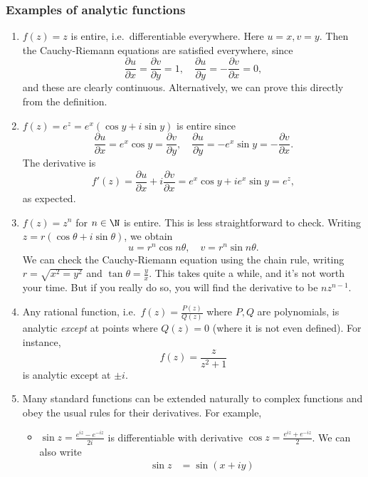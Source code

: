 \documentclass[a4paper]{article}
\begin{document}
\subsubsection*{Examples of analytic functions}
\begin{eg}\leavevmode
  \begin{enumerate}
    \item $f(z) = z$ is entire, i.e.\ differentiable everywhere. Here $u = x, v = y$. Then the Cauchy-Riemann equations are satisfied everywhere, since
      \[
        \frac{\partial u}{\partial x} = \frac{\partial v}{\partial y} = 1,\quad \frac{\partial u}{\partial y} = -\frac{\partial v}{\partial x} = 0,
      \]
      and these are clearly continuous. Alternatively, we can prove this directly from the definition.
    \item $f(z) = e^z = e^x (\cos y + i \sin y)$ is entire since
      \[
        \frac{\partial u}{\partial x} = e^x \cos y = \frac{\partial v}{\partial y},\quad \frac{\partial u}{\partial y} = - e^x \sin y = -\frac{\partial v}{\partial x}.
      \]
      The derivative is
      \[
        f'(z) = \frac{\partial u}{\partial x} + i \frac{\partial v}{\partial x} = e^x \cos y + i e^x \sin y = e^z,
      \]
      as expected.
    \item $f(z) = z^n$ for $n \in \N$ is entire. This is less straightforward to check. Writing $z = r(\cos \theta + i \sin \theta)$, we obtain
      \[
        u = r^n \cos n\theta,\quad v = r^n \sin n\theta.
      \]
      We can check the Cauchy-Riemann equation using the chain rule, writing $r = \sqrt{x^2 = y^2}$ and $\tan \theta = \frac{y}{x}$. This takes quite a while, and it's not worth your time. But if you really do so, you will find the derivative to be $nz^{n - 1}$.
    \item Any rational function, i.e.\ $f(z) = \frac{P(z)}{Q(z)}$ where $P, Q$ are polynomials, is analytic \emph{except} at points where $Q(z) = 0$ (where it is not even defined). For instance,
      \[
        f(z) = \frac{z}{z^2 + 1}
      \]
      is analytic except at $\pm i$.
    \item Many standard functions can be extended naturally to complex functions and obey the usual rules for their derivatives. For example,
      \begin{itemize}
        \item $\sin z = \frac{e^{iz} - e^{-iz}}{2i}$ is differentiable with derivative $\cos z = \frac{e^{iz} + e^{-iz}}{2}$. We can also write
          \begin{align*}
            \sin z &= \sin (x + iy) \\

\end{align*}
\end{itemize}
\end{enumerate}
\end{eg}
\end{document}
